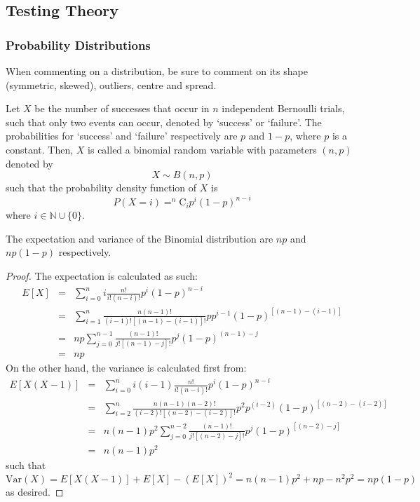 \documentclass[a4paper]{article}
\begin{document}
\subsection{Testing Theory}
\subsubsection*{Probability Distributions~\cite{ross2010first,dunlap1988experimental,squires_2001}}
\begin{Note}
When commenting on a distribution, be sure to comment on its shape (symmetric, skewed), outliers, centre and spread.
\end{Note}
\begin{defi}
Let $X$ be the number of successes that occur in $n$ independent Bernoulli trials, such that only two events can occur, denoted by `success' or `failure'. The probabilities for `success' and `failure' respectively are $p$ and $1-p$, where $p$ is a constant. Then, $X$ is called a binomial random variable with parameters $(n,p)$ denoted by 
$$X\sim B(n,p)$$
such that the probability density function of $X$ is
$$P(X=i)=^n\text{C}_ip^i(1-p)^{n-i}$$
where $i\in\mathbb{N}\cup\{0\}$.
\end{defi}
\begin{thm}
The expectation and variance of the Binomial distribution are $np$ and $np(1-p)$ respectively.
\end{thm}
\begin{proof}
The expectation is calculated as such:
\begin{eqnarray}
E[X]&=&\sum_{i=0}^ni\frac{n!}{i!(n-i)!}p^i(1-p)^{n-i}\nonumber\\
&=&\sum_{i=1}^n\frac{n(n-1)!}{(i-1)![(n-1)-(i-1)]!}pp^{i-1}(1-p)^{[(n-1)-(i-1)]}\nonumber\\&=&
np\sum_{j=0}^{n-1}\frac{(n-1)!}{j![(n-1)-j]!}p^j(1-p)^{(n-1)-j}\nonumber\\&=&np\nonumber
\end{eqnarray}
On the other hand, the variance is calculated first from:
\begin{eqnarray}
E[X(X-1)]&=&\sum_{i=0}^ni(i-1)\frac{n!}{i!(n-i)!}p^i(1-p)^{n-i}\nonumber\\&=&\sum_{i=2}^n\frac{n(n-1)(n-2)!}{(i-2)![(n-2)-(i-2)]!}p^2p^{(i-2)}(1-p)^{[(n-2)-(i-2)]}\nonumber\\&=&n(n-1)p^2\sum_{j=0}^{n-2}\frac{(n-1)!}{j![(n-2)-j]!}p^j(1-p)^{[(n-2)-j]}\nonumber\\&=&n(n-1)p^2\nonumber
\end{eqnarray}
such that 
$$\text{Var}(X)=E[X(X-1)]+E[X]-(E[X])^2=n(n-1)p^2+np-n^2p^2=np(1-p)$$
as desired.
\end{proof}
\end{document}
